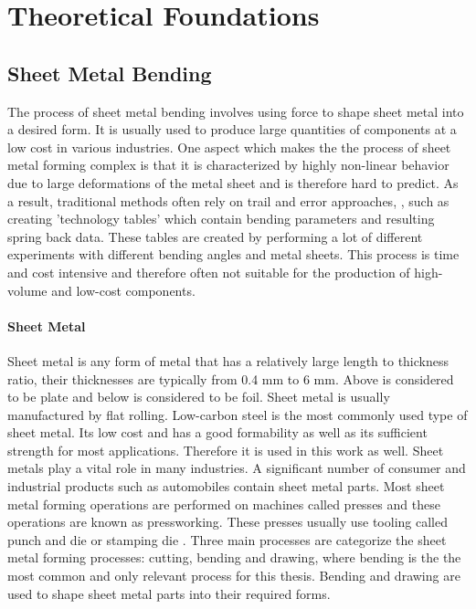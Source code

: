 \chapter{Theoretical Foundations}


\section{Sheet Metal Bending}
The process of sheet metal bending involves using force to shape sheet metal into a desired form.
It is usually used to produce large quantities of components at a low cost in various industries.
\cite[p. 1]{dib_singleensembleclassifiers_2020}
One aspect which makes the the process of sheet metal forming complex is that it is characterized
by highly non-linear behavior due to large deformations of the metal sheet and is therefore hard
to predict.
As a result, traditional methods often rely on trail and error approaches, \cite[p.
1]{dib_singleensembleclassifiers_2020}, such as creating 'technology tables' which contain
bending parameters and resulting spring back data. These tables are created by performing a lot
of different experiments with different bending angles and metal sheets.
This process is time and cost intensive and therefore often not suitable for the production of
high-volume and low-cost components.

\subsubsection{Sheet Metal}
Sheet metal is any form of metal that has a relatively large length to thickness ratio, their
thicknesses are typically from 0.4 mm to 6 mm. Above is considered to be plate and below is
considered to be foil. Sheet metal is usually manufactured by flat rolling.
Low-carbon steel is the most commonly used type of sheet metal. Its low cost and has a good
formability as well as its sufficient strength for most applications.
\cite[p. 405]{groover_fundamentalsmodernmanufacturing_2020}
Therefore it is used in this work as well.
Sheet metals play a vital role in many industries. A significant number of consumer and
industrial products such as automobiles contain sheet metal parts.
Most sheet metal forming operations are performed on machines called presses and these operations
are known as pressworking. These presses usually use tooling called punch and die or stamping die
. Three main processes are categorize the sheet metal forming processes: cutting, bending and
drawing, where bending is the the most common and only relevant process for this thesis. Bending
and drawing are used to shape sheet metal parts into their required forms.
\cite[p. 405]{groover_fundamentalsmodernmanufacturing_2020}

